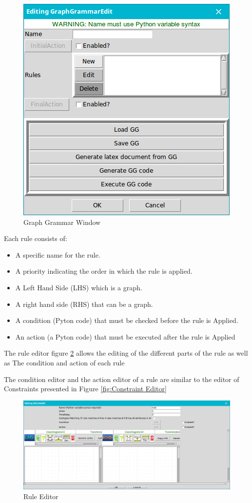 \begin{figure}[th]
	\centering 
	\includegraphics[scale=0.5]{ch3/img/GraphGrammar}
	\caption{\label{fig:Graph Grammar Window}Graph Grammar Window}
\end{figure} 
 

 Each rule consists of: 
\begin{itemize}
\newcommand{\localtextbulletone}{\textcolor{gray}{\raisebox{.45ex}{\rule{.6ex}{.6ex}}}}
\renewcommand{\labelitemi}{\localtextbulletone}
\item  A specific name for the rule.
\item  A priority indicating the order in which the rule is applied.
\item  A Left Hand Side (LHS) which is a graph.
\item  A right hand side (RHS) that can be a graph.
\item  A condition (Pyton code) that must be checked before the rule is
Applied.
\item An action (a Pyton code) that must be executed after the rule is
Applied
\end{itemize}


The rule editor figure \ref{fig:Rule Editor} allows the editing of the different parts of the rule as well as
The condition and action of each rule 
 
The condition editor and the action editor of a rule are similar to the editor of
Constraints presented in Figure \ref{fig:Constraint Editor}

\begin{figure}[th]
	\centering
 	\includegraphics[scale=0.38]{ch3/img/ruleEditor}
	\caption{\label{fig:Rule Editor}Rule Editor}
\end{figure} 
 


 